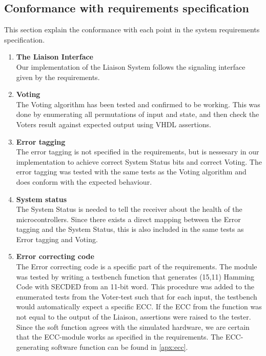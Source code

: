\subsection{Conformance with requirements specification}
This section explain the conformance with each point in the system requirements specification.
\begin{enumerate}
    \item{\textbf{The Liaison Interface}} \hfill\\
        Our implementation of the Liaison System follows the signaling interface given by the requirements\cite{task}.

    \item{\textbf{Voting}} \hfill\\
        The Voting algorithm has been tested and confirmed to be working. This was done by enumerating all
        permutations of input and state, and then check the Voters result against expected output using
        VHDL assertions.

    \item{\textbf{Error tagging}} \hfill\\
        The error tagging is not specified in the requirements, but is nessesary in our implementation to
        achieve correct System Status bits and correct Voting. The error tagging was tested with the same
        tests as the Voting algorithm and does conform with the expected behaviour.

    \item{\textbf{System status}} \hfill\\
        The System Status is needed to tell the receiver about the health of the microcontrollers. Since
        there exists a direct mapping between the Error tagging and the System Status, this is also
        included in the same tests as Error tagging and Voting.

    \item{\textbf{Error correcting code}} \hfill\\
        The Error correcting code is a specific part of the requirements\cite{task}. The module was tested by writing
        a testbench function that generates (15,11) Hamming Code with SECDED from an 11-bit word. This
        procedure was added to the enumerated tests from the Voter-test such that for each input, the testbench
        would automatically expect a specific ECC. If the ECC from the function was not equal to the output
        of the Liaison, assertions were raised to the tester. Since the soft function agrees with the simulated
        hardware, we are certain that the ECC-module works as specified in the requirements. The ECC-generating
        software function can be found in \autoref{apx:ecc}.


\end{enumerate}

